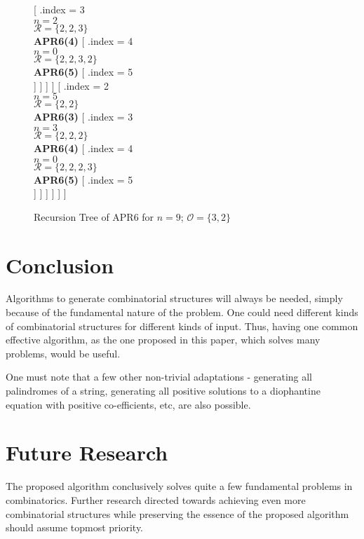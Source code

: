 \documentclass{article}
\begin{document}
\begin{figure*}[!htp]
{			[
				.{index = 3 \\ $n=2$ \\ $\mathcal{R}=\{2,2,3\}$ \\ \textbf{APR6(4)}} 
				[
					.{index = 4 \\ $n=0$ \\ $\mathcal{R}=\{2,2,3,2\}$ \\ \textbf{APR6(5)}}
					[
						.{index = 5 \\ }
					]
				] 
			]
		]
		[
			.{index = 2 \\ $n=5$ \\ $\mathcal{R}=\{2,2\}$ \\ \textbf{APR6(3)}}
			[
				.{index = 3 \\ $n=3$ \\ $\mathcal{R}=\{2,2,2\}$ \\ \textbf{APR6(4)}} 
				[
					.{index = 4 \\ $n=0$ \\ $\mathcal{R}=\{2,2,2,3\}$ \\ \textbf{APR6(5)}}
					[
						.{index = 5 \\ }
					]
				] 
			]
		]
	]
]}
\caption{Recursion Tree of APR6 for $n=9$; $\mathcal{O} = \{3,2\}$}
\label{fig:compositions}
\end{figure*}

\section{Conclusion}
\label{sec:conc}

Algorithms to generate combinatorial structures will always be needed, simply because of the fundamental nature of the problem. One could need different kinds of combinatorial structures for different kinds of input. Thus, having one common effective algorithm, as the one proposed in this paper, which solves many problems, would be useful.

One must note that a few other non-trivial adaptations - generating all palindromes of a string, generating all positive solutions to a diophantine equation with positive co-efficients, etc, are also possible.

\section{Future Research}
\label{sec:future}

The proposed algorithm conclusively solves quite a few fundamental problems in combinatorics. Further research directed towards achieving even more combinatorial structures while preserving the essence of the proposed algorithm should assume topmost priority.
\end{document}
